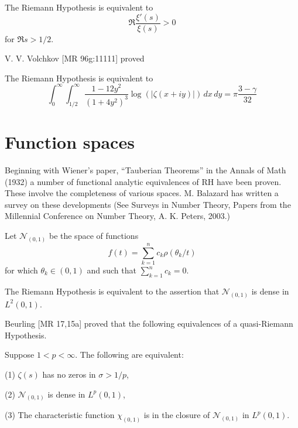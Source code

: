 \documentclass[12pt,letterpaper, reqno]{amsart}
\begin{document}
\begin{problemblock}
\begin{rhequivalence}[6.2]
The Riemann Hypothesis is
equivalent to
$$\Re \frac{\xi'(s)}{\xi(s)}>0$$
for $\Re s>1/2$.
\end{rhequivalence}

\end{problemblock}

\begin{problemblock}
V. V. Volchkov [MR 96g:11111] proved
\begin{rhequivalence}[6.3]
The Riemann Hypothesis is
equivalent to
$$
\int_0^\infty \int_{1/2}^\infty
 \frac{1-12y^2}{(1+4 y^2)^3}\log(|\zeta(x+iy)|)\, dx \, dy
=\pi\frac{3-\gamma}{32}
$$
\end{rhequivalence}
\end{problemblock}


\section{Function spaces }

Beginning with Wiener's paper, ``Tauberian Theorems'' in the Annals of
Math (1932) a number of functional analytic equivalences of RH have been
proven. These involve the completeness of various spaces.  M. Balazard has
written a survey on these developments (See Surveys
in Number Theory, Papers from the Millennial Conference on Number Theory,
A. K. Peters, 2003.)

\begin{problemblock}
Let $\mathcal N_{(0,1)} $ be the space of functions
$$
f(t)=\sum_{k=1}^n c_k \rho(\theta_k/t)
$$
for which $\theta_k\in (0,1)$ and such that $\sum_{k=1}^n c_k=0$.

\begin{rhequivalence}[7.1]
The Riemann Hypothesis is
equivalent to the assertion that $\mathcal N_{(0,1)} $
is dense in  $L^2(0,1)$.
\end{rhequivalence}
\end{problemblock}

\begin{problemblock}
 Beurling [MR 17,15a] proved that the following
equivalences of a quasi-Riemann Hypothesis.
\begin{rhequivalence}[7.2] 
Suppose $1<p<\infty$.  The following
are equivalent:

(1)   $\zeta(s)$ has no zeros in $\sigma>1/p$,

(2)   $\mathcal N_{(0,1)} $ is dense in  $L^p(0,1)$,

(3)  The characteristic function $\chi_{(0,1)}$ is in the closure of $\mathcal N_{(0,1)} $   in  $L^p(0,1)$.

\end{rhequivalence}
\end{problemblock}
\end{document}
